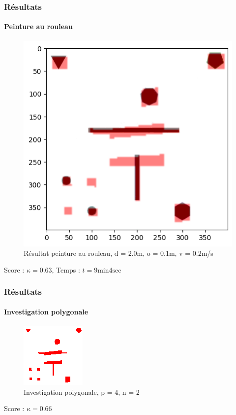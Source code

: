 \documentclass{beamer}
\begin{document}
		\begin{frame}
			\frametitle{Résultats}
			\framesubtitle{Peinture au rouleau}
			\begin{figure}
				\centering
				\includegraphics[scale=0.5]{graphics/result.png}
				\caption{Résultat peinture au rouleau, d = 2.0m, o = 0.1m, v = 0.2m/s}
			\end{figure}
			Score : $\kappa = 0.63$, Temps : $t = 9 \text{min} 4 \text{sec}$
		\end{frame}
		\begin{frame}
			\frametitle{Résultats}
			\framesubtitle{Investigation polygonale}
			\begin{figure}
				\centering
				\includegraphics[scale=1.0]{graphics/occupancy_grid.png}
				\caption{Investigation polygonale, p = 4, n = 2}
			\end{figure}
			Score : $\kappa = 0.66$
		\end{frame}
\end{document}
